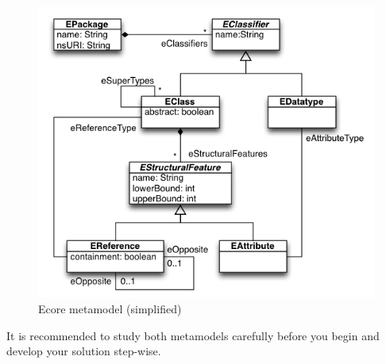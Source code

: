 \documentclass{article}
\begin{document}
	\begin{figure}[htb]
		\centering
		\includegraphics[width=0.7\linewidth]{figures/ecore}
		\caption{Ecore metamodel (simplified)}
		\label{fig:ecore}
	\end{figure}
	
	It is recommended to study both metamodels carefully before you begin and develop your solution step-wise.
	
\end{document}
